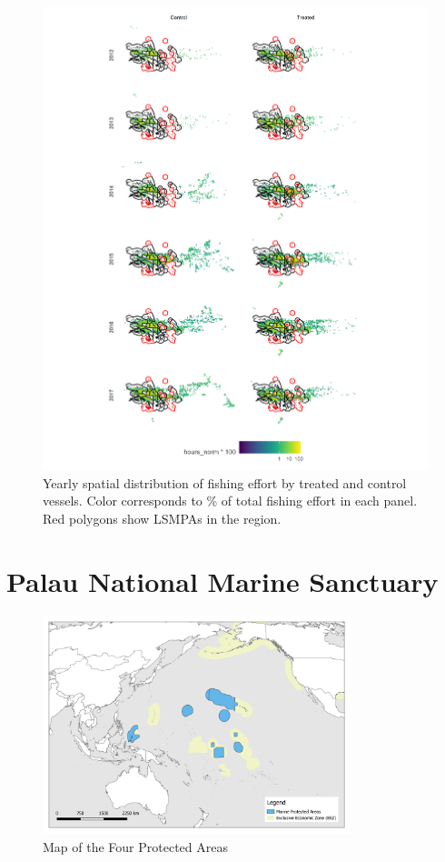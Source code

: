 \documentclass[9p,twocolumn,twoside,lineno]{pnas-new}
\begin{document}
\begin{figure}
\centering
\includegraphics{img/fishing_raster.png}
\caption{\label{fig:fishing_raster}Yearly spatial distribution of fishing effort by treated and control vessels. Color corresponds to \% of total fishing effort in each panel. Red polygons show LSMPAs in the region.}
\end{figure}

\clearpage

\section{Palau National Marine Sanctuary}\label{PNMS}

\begin{figure}
	\includegraphics[width=0.8\textwidth]{img/Color_V1.png}
	\caption{Map of the Four Protected Areas}
	\label{fig:maps}
\end{figure}
\end{document}
